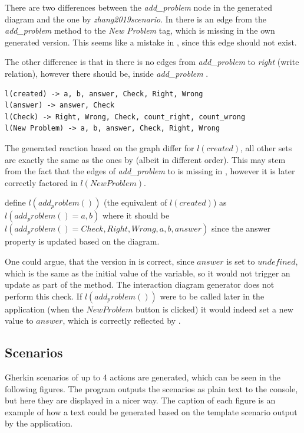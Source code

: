 There are two differences between the \textit{add\_problem} node in the generated diagram and the one by \textit{zhang2019scenario}.
In \textcite{zhang2019scenario} there is an edge from
the \textit{add\_problem} method to the \textit{New Problem} tag, which is missing in the own generated version. This seems like a mistake in \parencite{zhang2019scenario}, since this edge should not exist.

The other difference is that in \parencite{zhang2019scenario} there is no edges from \textit{add\_problem} to \textit{right} (write relation), however there should be, 
inside \textit{add\_problem} .

\begin{lstlisting}
l(created) -> a, b, answer, Check, Right, Wrong
l(answer) -> answer, Check
l(Check) -> Right, Wrong, Check, count_right, count_wrong
l(New Problem) -> a, b, answer, Check, Right, Wrong
\end{lstlisting}

The generated reaction based on the graph differ for $l(created)$, all other sets are exactly the same as the ones by \textcite{zhang2019scenario} (albeit in different order). This may stem from the fact that the edges of \textit{add\_problem} to  is missing in \parencite{zhang2019scenario}, however it is later correctly factored in $l(New Problem)$.

\textcite{zhang2019scenario} define $l(add_problem())$ 
(the equivalent of $l(created)$) as $l(add_problem() = 
{a, b})$ where it should be 
$l(add_problem() = {Check, Right, Wrong, a, b, answer })$ since the answer property is updated based on the diagram. 

One could argue, that the version in \parencite{zhang2019scenario} is correct, since $answer$ is set to $undefined$, which is the same as the initial value of the variable, so it would not trigger an update as part of the  method. The interaction diagram generator does not perform this check. If $l(add_problem())$ were to be called later in the application (when the $New Problem$ button is clicked) it would indeed set a new value to $answer$, which is correctly reflected by \textcite{zhang2019scenario}.


\subsection{Scenarios}
Gherkin scenarios of up to 4 actions are generated, which can be seen in the following figures. The program outputs the scenarios as plain text to the console, but here they are displayed in a nicer way. The caption of each figure is an example of how a text could be generated based on the template scenario output by the application.

